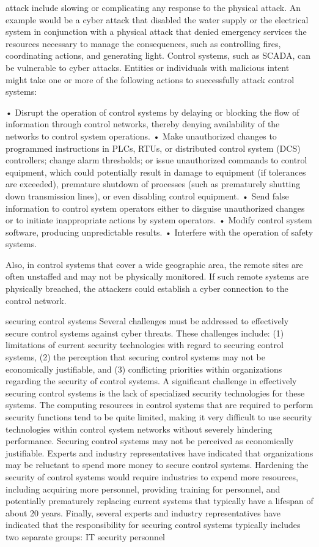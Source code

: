 \documentclass{article}
\begin{document}
attack include slowing or complicating any response to the physical
attack. An example would be a cyber attack that disabled the water
supply or the electrical system in conjunction with a physical attack
that denied emergency services the resources necessary to manage the
consequences, such as controlling fires, coordinating actions, and
generating light. Control systems, such as SCADA, can be vulnerable to
cyber attacks. Entities or individuals with malicious intent might take
one or more of the following actions to successfully attack control
systems:

• Disrupt the operation of control systems by delaying or blocking the
flow of information through control networks, thereby denying
availability of the networks to control system operations. • Make
unauthorized changes to programmed instructions in PLCs, RTUs, or
distributed control system (DCS) controllers; change alarm thresholds;
or issue unauthorized commands to control equipment, which could
potentially result in damage to equipment (if tolerances are exceeded),
premature shutdown of processes (such as prematurely shutting down
transmission lines), or even disabling control equipment. • Send false
information to control system operators either to disguise unauthorized
changes or to initiate inappropriate actions by system operators. •
Modify control system software, producing unpredictable results. •
Interfere with the operation of safety systems.

Also, in control systems that cover a wide geographic area, the remote
sites are often unstaffed and may not be physically monitored. If such
remote systems are physically breached, the attackers could establish a
cyber connection to the control network.

securing control systems Several challenges must be addressed to
effectively secure control systems against cyber threats. These
challenges include: (1) limitations of current security technologies
with regard to securing control systems, (2) the perception that
securing control systems may not be economically justifiable, and (3)
conflicting priorities within organizations regarding the security of
control systems. A significant challenge in effectively securing control
systems is the lack of specialized security technologies for these
systems. The computing resources in control systems that are required to
perform security functions tend to be quite limited, making it very
difficult to use security technologies within control system networks
without severely hindering performance. Securing control systems may not
be perceived as economically justifiable. Experts and industry
representatives have indicated that organizations may be reluctant to
spend more money to secure control systems. Hardening the security of
control systems would require industries to expend more resources,
including acquiring more personnel, providing training for personnel,
and potentially prematurely replacing current systems that typically
have a lifespan of about 20 years. Finally, several experts and industry
representatives have indicated that the responsibility for securing
control systems typically includes two separate groups: IT security
personnel
\end{document}
